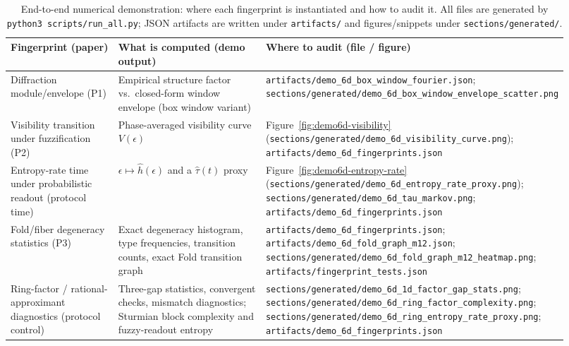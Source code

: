 \begin{table}[t]
  \centering
  \caption{End-to-end numerical demonstration: where each fingerprint is instantiated and how to audit it. All files are generated by \texttt{python3 scripts/run\_all.py}; JSON artifacts are written under \texttt{artifacts/} and figures/snippets under \texttt{sections/generated/}.}
  \label{tab:fingerprint-audit-map}
  \begin{tabular}{@{}p{0.22\linewidth}p{0.36\linewidth}p{0.34\linewidth}@{}}
    \toprule
    Fingerprint (paper) & What is computed (demo output) & Where to audit (file / figure) \\
    \midrule
    Diffraction module/envelope (P1) &
    Empirical structure factor vs.\ closed-form window envelope (box window variant) &
    \texttt{artifacts/demo\_6d\_box\_window\_fourier.json};
    \texttt{sections/generated/demo\_6d\_box\_window\_envelope\_scatter.png} \\
    \addlinespace
    Visibility transition under fuzzification (P2) &
    Phase-averaged visibility curve \(V(\epsilon)\) &
    Figure~\ref{fig:demo6d-visibility} (\texttt{sections/generated/demo\_6d\_visibility\_curve.png});
    \texttt{artifacts/demo\_6d\_fingerprints.json} \\
    \addlinespace
    Entropy-rate time under probabilistic readout (protocol time) &
    \(\epsilon\mapsto \widehat h(\epsilon)\) and a \(\widehat\tau(t)\) proxy &
    Figure~\ref{fig:demo6d-entropy-rate} (\texttt{sections/generated/demo\_6d\_entropy\_rate\_proxy.png});
    \texttt{sections/generated/demo\_6d\_tau\_markov.png};
    \texttt{artifacts/demo\_6d\_fingerprints.json} \\
    \addlinespace
    Fold/fiber degeneracy statistics (P3) &
    Exact degeneracy histogram, type frequencies, transition counts, exact Fold transition graph &
    \texttt{artifacts/demo\_6d\_fingerprints.json};
    \texttt{artifacts/demo\_6d\_fold\_graph\_m12.json};
    \texttt{sections/generated/demo\_6d\_fold\_graph\_m12\_heatmap.png};
    \texttt{artifacts/fingerprint\_tests.json} \\
    \addlinespace
    Ring-factor / rational-approximant diagnostics (protocol control) &
    Three-gap statistics, convergent checks, mismatch diagnostics; Sturmian block complexity and fuzzy-readout entropy &
    \texttt{sections/generated/demo\_6d\_1d\_factor\_gap\_stats.png};
    \texttt{sections/generated/demo\_6d\_ring\_factor\_complexity.png};
    \texttt{sections/generated/demo\_6d\_ring\_entropy\_rate\_proxy.png};
    \texttt{artifacts/demo\_6d\_fingerprints.json} \\
    \bottomrule
  \end{tabular}
\end{table}


